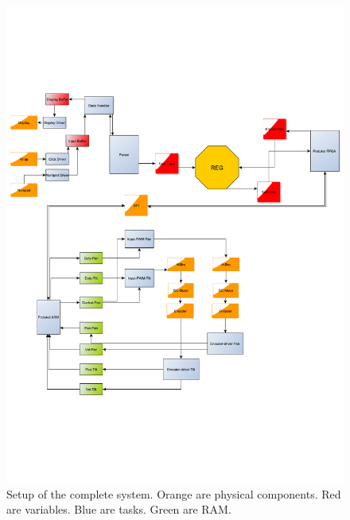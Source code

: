 \begin{figure}[htb]
	\begin{center}
	\includegraphics[scale=0.8,trim=100 130 100 250]{graphics/Project4GreaterPresentation3.pdf} %
	\caption{Setup of the complete system. Orange are physical components. Red are variables. Blue are tasks. Green are RAM. }
	\label{fig:completesystem}			%
	\end{center}
\end{figure}